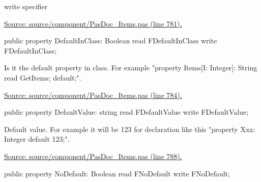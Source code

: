 \documentclass{report}
\newif\ifpdf
\begin{document}
\begin{list}{}
\begin{flushleft}
\ifpdf
\end{flushleft}
\fi


\par write specifier\par
\href{https://github.com/pasdoc/pasdoc/blob/master/source/component/PasDoc_Items.pas#L781}{Source: source/component/PasDoc{\_}Items.pas (line 781).}\label{PasDoc_Items.TPasProperty-DefaultInClass}
\item[\textbf{DefaultInClass}\hfill]
\ifpdf
\begin{flushleft}
\fi
\begin{ttfamily}
public property DefaultInClass: Boolean read FDefaultInClass write FDefaultInClass;\end{ttfamily}

\ifpdf
\end{flushleft}
\fi


\par Is it the default property in class. For example "property Items[I: Integer]: String read GetItems; default;".\par
\href{https://github.com/pasdoc/pasdoc/blob/master/source/component/PasDoc_Items.pas#L784}{Source: source/component/PasDoc{\_}Items.pas (line 784).}\label{PasDoc_Items.TPasProperty-DefaultValue}
\item[\textbf{DefaultValue}\hfill]
\ifpdf
\begin{flushleft}
\fi
\begin{ttfamily}
public property DefaultValue: string read FDefaultValue write FDefaultValue;\end{ttfamily}

\ifpdf
\end{flushleft}
\fi


\par Default value. For example it will be 123 for declaration like this "property Xxx: Integer default 123;".\par
\href{https://github.com/pasdoc/pasdoc/blob/master/source/component/PasDoc_Items.pas#L788}{Source: source/component/PasDoc{\_}Items.pas (line 788).}\label{PasDoc_Items.TPasProperty-NoDefault}
\item[\textbf{NoDefault}\hfill]
\ifpdf
\begin{flushleft}
\fi
\begin{ttfamily}
public property NoDefault: Boolean read FNoDefault write FNoDefault;\end{ttfamily}

\ifpdf
\end{flushleft}
\fi



\end{list}
\end{document}
